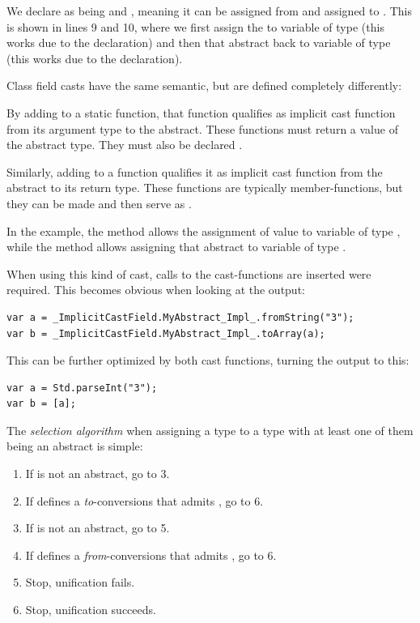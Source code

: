 \documentclass{haxe}
\begin{document}
We declare  as being  and , meaning it can be assigned from  and assigned to . This is shown in lines 9 and 10, where we first assign the   to variable  of type  (this works due to the  declaration) and then that abstract back to variable  of type  (this works due to the  declaration).

Class field casts have the same semantic, but are defined completely differently:

By adding  to a static function, that function qualifies as implicit cast function from its argument type to the abstract. These functions must return a value of the abstract type. They must also be declared .

Similarly, adding  to a function qualifies it as implicit cast function from the abstract to its return type. These functions are typically member-functions, but they can be made  and then serve as .

In the example, the method  allows the assignment of value  to variable  of type , while the method  allows assigning that abstract to variable  of type .

When using this kind of cast, calls to the cast-functions are inserted were required. This becomes obvious when looking at the  output:

\begin{lstlisting}
var a = _ImplicitCastField.MyAbstract_Impl_.fromString("3");
var b = _ImplicitCastField.MyAbstract_Impl_.toArray(a);
\end{lstlisting}
This can be further optimized by  both cast functions, turning the output to this:

\begin{lstlisting}
var a = Std.parseInt("3");
var b = [a];
\end{lstlisting}
The \emph{selection algorithm} when assigning a type  to a type  with at least one of them being an abstract is simple:

\begin{enumerate}
	\item If  is not an abstract, go to 3.
	\item If  defines a \emph{to}-conversions that admits , go to 6.
	\item If  is not an abstract, go to 5.
	\item If  defines a \emph{from}-conversions that admits , go to 6.
	\item Stop, unification fails.
	\item Stop, unification succeeds.
\end{enumerate}
\end{document}

